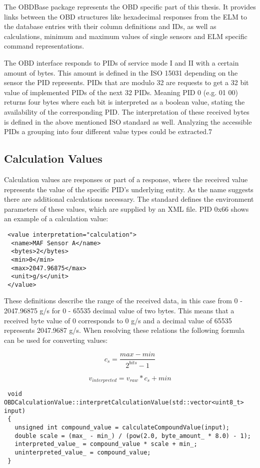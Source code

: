 The OBDBase package represents the OBD specific part of this thesis. It provides links between the OBD structures like hexadecimal responses 
from the ELM to the database entries with their column definitions and IDs, as well as calculations, minimum and maximum values of single 
sensors and ELM specific command representations.

The OBD interface responds to PIDs of service mode I and II with a certain amount of bytes. This amount is defined in the ISO 15031 depending 
on the sensor the PID represents. PIDs that are modulo 32 are requests to get a 32 bit value of implemented PIDs of the next 32 PIDs. Meaning 
PID 0 (e.g. 01 00) returns four bytes where each bit is interpreted as a boolean value, stating the availability of the corresponding PID. The 
interpretation of these received bytes is defined in the above mentioned ISO standard as well. Analyzing the accessible PIDs a grouping into 
four different value types could be extracted.7

\subsection{Calculation Values}

Calculation values are responses or part of a response, where the received value represents the value of the specific PID’s underlying entity.
As the name suggests there are additional calculations necessary. The standard defines the environment parameters of these values, which are 
supplied by an XML file. PID 0x66 shows an example of a calculation value:

\begin{lstlisting}
 <value interpretation="calculation">
  <name>MAF Sensor A</name>
  <bytes>2</bytes>
  <min>0</min>
  <max>2047.96875</max>
  <unit>g/s</unit>
 </value>
\end{lstlisting}

These definitions describe the range of the received data, in this case from 0 - 2047.96875 g/s for 0 - 65535 decimal value of two bytes. 
This means that a received byte value of 0 corresponds to 0 g/s and a decimal value of 65535 represents 2047.9687 g/s. When resolving these 
relations the following formula can be used for converting values: 

\[ c_s = \frac{max - min}{2^{bits} - 1} \]

\[ v_{interpreted} = v_{raw} * c_s + min \]

\begin{lstlisting}
 void OBDCalculationValue::interpretCalculationValue(std::vector<uint8_t> input)
 {
   unsigned int compound_value = calculateCompoundValue(input);
   double scale = (max_ - min_) / (pow(2.0, byte_amount_ * 8.0) - 1);
   interpreted_value_ = compound_value * scale + min_;
   uninterpreted_value_ = compound_value;
 }
\end{lstlisting}

